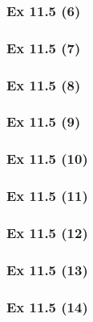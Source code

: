 \subsubsection{Ex 11.5 (6)}\label{sec:Ex_11.5.6}

\subsubsection{Ex 11.5 (7)}\label{sec:Ex_11.5.7}

\subsubsection{Ex 11.5 (8)}\label{sec:Ex_11.5.8}

\subsubsection{Ex 11.5 (9)}\label{sec:Ex_11.5.9}

\subsubsection{Ex 11.5 (10)}\label{sec:Ex_11.5.10}

\newpage		%

\subsubsection{Ex 11.5 (11)}\label{sec:Ex_11.5.11}

\subsubsection{Ex 11.5 (12)}\label{sec:Ex_11.5.12}

\subsubsection{Ex 11.5 (13)}\label{sec:Ex_11.5.13}

\subsubsection{Ex 11.5 (14)}\label{sec:Ex_11.5.14}

\newpage		%


